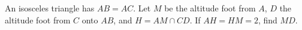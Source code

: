 An isosceles triangle has $AB=AC$. Let $M$ be the altitude foot from $A$, $D$ the altitude foot from $C$ onto $AB$, and $H=AM\cap CD$. If $AH=HM=2$, find $MD$.
